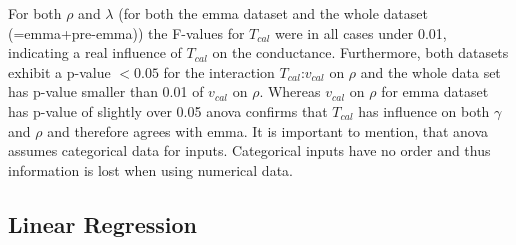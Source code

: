 For both $\rho$ and $\lambda$ (for both the \gls{emma} dataset and the whole dataset (=\gls{emma}+pre-\gls{emma})) 
the F-values for $T_{cal}$ were in all cases under 0.01, 
indicating a real influence of $T_{cal}$ on the conductance.
Furthermore, both datasets exhibit a p-value $< 0.05$ for the interaction $T_{cal}$:$v_{cal}$ on $\rho$
and the whole data set has p-value smaller than 0.01 of $v_{cal}$ on $\rho$. 
Whereas $v_{cal}$ on $\rho$ for \gls{emma} dataset has p-value of slightly over 0.05
%
\Gls{anova} confirms that $T_{cal}$ has influence on both $\gamma$ and $\rho$ 
and therefore agrees with \gls{emma}.
It is important to mention, that \gls{anova} assumes categorical data for inputs. 
Categorical inputs have no order and thus information is lost when using numerical data. 


\subsection{Linear Regression} 

